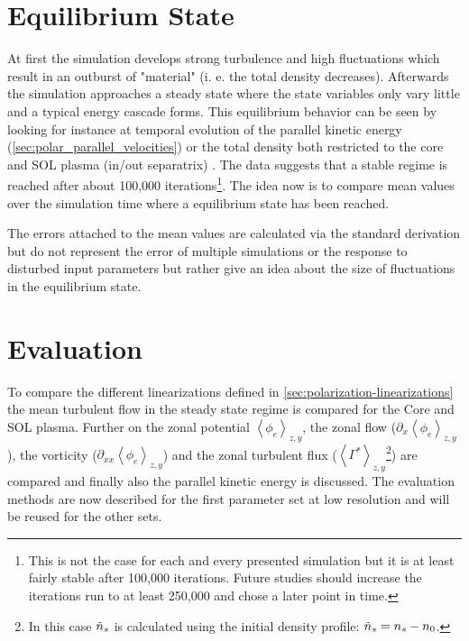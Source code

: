 \documentclass[master.tex]{subfiles}
\newcommand{\meanxy}[1]{\left<#1\right>_{z,y}}
\begin{document}
\section{Equilibrium State}
At first the simulation develops strong turbulence and high fluctuations which result in an outburst of "material" (i. e. the total density decreases). Afterwards the simulation approaches a steady state where the state variables only vary little and a typical energy cascade forms. This equilibrium behavior can be seen by looking for instance at temporal evolution of the parallel kinetic energy (\autoref{sec:polar_parallel_velocities}) or the total density both restricted to the core and \ac{SOL} plasma (in/out separatrix) . The data suggests that a stable regime is reached after about 100,000 iterations\footnote{This is not the case for each and every presented simulation but it is at least fairly stable after 100,000 iterations. Future studies should increase the iterations run to at least 250,000 and chose a later point in time.}. The idea now is to compare mean values over the simulation time where a equilibrium state has been reached. 



\begin{blockquote}
    The errors attached to the mean values are calculated via the standard derivation but do not represent the error of multiple simulations or the response to disturbed input parameters but rather give an idea about the size of fluctuations in the equilibrium state.
\end{blockquote}
    
\section{Evaluation}
To compare the different linearizations defined in \autoref{sec:polarization-linearizations} the mean turbulent flow in the steady state regime is compared for the Core and \ac{SOL} plasma. Further on the zonal potential  $\meanxy{\phi_e}$, the zonal flow ($\partial_x \meanxy{\phi_e}$), the vorticity ($\partial_{xx}\meanxy{\phi_e}$) and the zonal turbulent flux ($\left<\Gamma^*\right>_{z,y}$\footnote{In this case $\Tilde{n}_s$ is calculated using the initial density profile: $\Tilde{n}_s = n_s - n_0$.}) are compared and finally also the parallel kinetic energy is discussed. The evaluation methods are now described for the first parameter set at low resolution and will be reused for the other sets.
\end{document}
